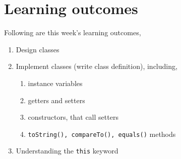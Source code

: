 \renewcommand{\labelenumi}{\alph{enumi}.}
 
\section*{Learning outcomes}
Following are this week's learning outcomes,
\begin{enumerate}
\item Design classes
\item Implement classes (write class definition), including,
	\begin{enumerate}
		\item instance variables
		\item getters and setters
		\item constructors, that call setters
		\item \texttt{toString(), compareTo(), equals()} methods
	\end{enumerate}
\item Understanding the \texttt{this} keyword
\end{enumerate}


